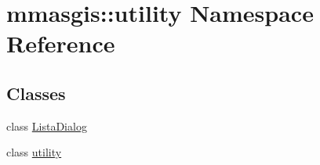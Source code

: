 \hypertarget{namespacemmasgis_1_1utility}{
\section{mmasgis::utility Namespace Reference}
\label{namespacemmasgis_1_1utility}
}
\subsection*{Classes}
\begin{DoxyCompactItemize}
\item 
class \hyperlink{classmmasgis_1_1utility_1_1ListaDialog}{ListaDialog}
\item 
class \hyperlink{classmmasgis_1_1utility_1_1utility}{utility}
\end{DoxyCompactItemize}
